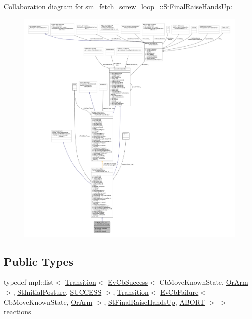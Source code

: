 Collaboration diagram for sm\+\_\+fetch\+\_\+screw\+\_\+loop\+\_\+:\+:St\+Final\+Raise\+Hands\+Up\+:
\nopagebreak
\begin{figure}[H]
\begin{center}
\leavevmode
\includegraphics[width=350pt]{structsm__fetch__screw__loop__1_1_1StFinalRaiseHandsUp__coll__graph}
\end{center}
\end{figure}
\subsection*{Public Types}
\begin{DoxyCompactItemize}
\item 
typedef mpl\+::list$<$ \hyperlink{classsmacc_1_1Transition}{Transition}$<$ \hyperlink{structsmacc_1_1EvCbSuccess}{Ev\+Cb\+Success}$<$ Cb\+Move\+Known\+State, \hyperlink{classsm__fetch__screw__loop__1_1_1OrArm}{Or\+Arm} $>$, \hyperlink{structsm__fetch__screw__loop__1_1_1StInitialPosture}{St\+Initial\+Posture}, \hyperlink{structsmacc_1_1default__transition__tags_1_1SUCCESS}{S\+U\+C\+C\+E\+SS} $>$, \hyperlink{classsmacc_1_1Transition}{Transition}$<$ \hyperlink{structsmacc_1_1EvCbFailure}{Ev\+Cb\+Failure}$<$ Cb\+Move\+Known\+State, \hyperlink{classsm__fetch__screw__loop__1_1_1OrArm}{Or\+Arm} $>$, \hyperlink{structsm__fetch__screw__loop__1_1_1StFinalRaiseHandsUp}{St\+Final\+Raise\+Hands\+Up}, \hyperlink{structsmacc_1_1default__transition__tags_1_1ABORT}{A\+B\+O\+RT} $>$ $>$ \hyperlink{structsm__fetch__screw__loop__1_1_1StFinalRaiseHandsUp_aa0342e007f95e923372c938e67110cb5}{reactions}
\end{DoxyCompactItemize}
